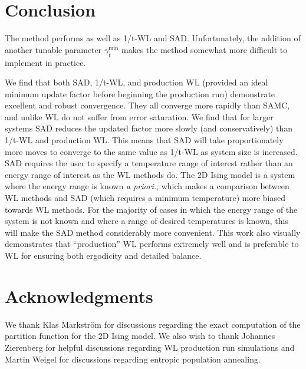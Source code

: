 \documentclass[letterpaper,twocolumn,amsmath,amssymb,pre,aps,10pt]{revtex4-1}
\begin{document}
\section{Conclusion}
The method performs as well as 1/t-WL and SAD.  Unfortunately, the addition of another tunable parameter $\gamma_{t}^{\min}$ makes the method somewhat more difficult to implement in practice.

We find that both SAD, 1/t-WL, and production WL (provided an ideal minimum update factor before beginning the production run) demonstrate excellent and robust convergence.
They all converge more rapidly than SAMC, and unlike WL do not suffer from
error saturation. We find that for larger systems SAD reduces the updated factor
more slowly (and conservatively) than 1/t-WL and production WL. This means that SAD will take
proportionately more moves to converge to the same value as 1/t-WL as system
size is increased. SAD requires the user to specify a temperature range of
interest rather than an energy range of interest as the WL methods do. The 2D Ising model is a system where the energy range is known \emph{a priori.}, which makes a comparison between WL methods and SAD (which requires a minimum temperature) more biased towards WL methods. For the majority of cases in which the energy range of the system is not known and where a range of desired temperatures is known, this will make the SAD method
considerably more convenient. This work also visually demonstrates that ``production'' WL performs extremely well and is preferable to WL for ensuring both ergodicity and detailed balance.

\section{Acknowledgments}

We thank Klas Markstr\"{o}m for discussions regarding the exact computation of the partition function for the 2D Ising model. We also wish to thank Johannes Zierenberg for helpful discussions regarding WL production run simulations and
Martin Weigel for discussions regarding entropic population annealing.

\end{document}
